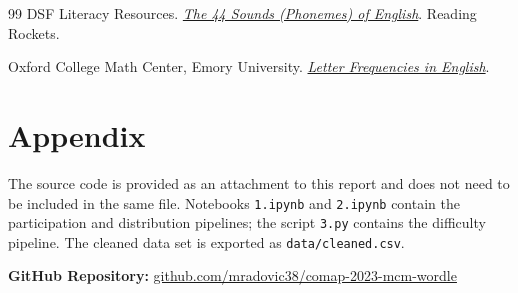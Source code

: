 \documentclass{article}
\begin{document}
\begin{thebibliography}{99}
   DSF Literacy Resources.
        \href{https://www.readingrockets.org/sites/default/files/migrated/the-44-phonemes-of-english.pdf}{\emph{The
        44 Sounds (Phonemes) of English}}. Reading Rockets.

   Oxford College Math Center, Emory University.
        \href{https://mathcenter.oxford.emory.edu/site/math125/englishLetterFreqs/}{\emph{Letter
        Frequencies in English}}.
\end{thebibliography}

\appendix

\section{Appendix}

The source code is provided as an attachment to this report and does not need
to be included in the same file. Notebooks \texttt{1.ipynb} and
\texttt{2.ipynb} contain the participation and distribution pipelines; the
script \texttt{3.py} contains the difficulty pipeline. The cleaned data set is
exported as \texttt{data/cleaned.csv}.

\vspace{0.5em}

\noindent\textbf{GitHub Repository:}
\href{https://github.com/mradovic38/comap-2023-mcm-wordle}
{github.com/mradovic38/comap-2023-mcm-wordle}
\end{document}
